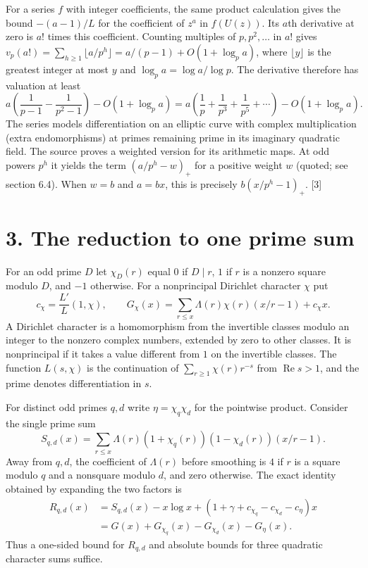 \documentclass[11pt,letterpaper]{article}
\newcommand{\re}{\operatorname{Re}}
\begin{document}
{For a series $f$ with integer coefficients, the same product calculation gives the bound $-(a-1)/L$ for the coefficient of $z^a$ in $f(U(z))$. Its $a$th derivative at zero is $a!$ times this coefficient. Counting multiples of $p,p^2,\ldots$ in $a!$ gives $v_p(a!)=\sum_{h\ge1}\lfloor a/p^h\rfloor=a/(p-1)+O(1+\log_p a)$, where $\lfloor y\rfloor$ is the greatest integer at most $y$ and $\log_p a=\log a/\log p$. The derivative therefore has valuation at least
\begin{equation}\label{D:43}
 a\left(\frac1{p-1}-\frac1{p^2-1}\right)-O(1+\log_p a)
 =a\left(\frac1p+\frac1{p^3}+\frac1{p^5}+\cdots\right)-O(1+\log_p a).
\end{equation}
The series models differentiation on an elliptic curve with complex multiplication (extra endomorphisms) at primes remaining prime in its imaginary quadratic field. The source proves a weighted version for its arithmetic maps. At odd powers $p^h$ it yields the term $(a/p^h-w)_+$ for a positive weight $w$ (quoted; see section 6.4). When $w=b$ and $a=bx$, this is precisely $b(x/p^h-1)_+$. [3]

\newpage
\section*{3. The reduction to one prime sum}

For an odd prime $D$ let $\chi_D(r)$ equal $0$ if $D\mid r$, $1$ if $r$ is a nonzero square modulo $D$, and $-1$ otherwise. For a nonprincipal Dirichlet character $\chi$ put
\begin{equation}\label{D:44}
 c_\chi=\frac{L'}{L}(1,\chi),\qquad
 G_\chi(x)=\sum_{r\le x}\Lambda(r)\chi(r)(x/r-1)+c_\chi x .
\end{equation}
A Dirichlet character is a homomorphism from the invertible classes modulo an integer to the nonzero complex numbers, extended by zero to other classes. It is nonprincipal if it takes a value different from $1$ on the invertible classes. The function $L(s,\chi)$ is the continuation of $\sum_{r\ge1}\chi(r)r^{-s}$ from $\re s>1$, and the prime denotes differentiation in $s$.

For distinct odd primes $q,d$ write $\eta=\chi_q\chi_d$ for the pointwise product. Consider the single prime sum
\begin{equation}\label{D:45}
 S_{q,d}(x)=\sum_{r\le x}\Lambda(r)(1+\chi_q(r))(1-\chi_d(r))(x/r-1).
\end{equation}
Away from $q,d$, the coefficient of $\Lambda(r)$ before smoothing is $4$ if $r$ is a square modulo $q$ and a nonsquare modulo $d$, and zero otherwise. The exact identity obtained by expanding the two factors is
\begin{equation}\label{D:46}
 \begin{aligned}
 R_{q,d}(x)&=S_{q,d}(x)-x\log x+(1+\gamma+c_{\chi_q}-c_{\chi_d}-c_\eta)x\\
           &=G(x)+G_{\chi_q}(x)-G_{\chi_d}(x)-G_\eta(x).
 \end{aligned}
\end{equation}
Thus a one-sided bound for $R_{q,d}$ and absolute bounds for three quadratic character sums suffice.

}
\end{document}
